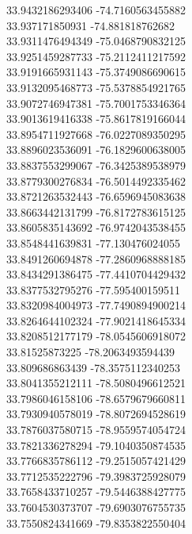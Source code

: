 {33.9432186293406	-74.7160563455882\\
33.937171850931	-74.881818762682\\
33.9311476494349	-75.0468790832125\\
33.9251459287733	-75.2112411217592\\
33.9191665931143	-75.3749086690615\\
33.9132095468773	-75.5378854921765\\
33.9072746947381	-75.7001753346364\\
33.9013619416338	-75.8617819166044\\
33.8954711927668	-76.0227089350295\\
33.8896023536091	-76.1829600638005\\
33.8837553299067	-76.3425389538979\\
33.8779300276834	-76.5014492335462\\
33.8721263532443	-76.6596945083638\\
33.8663442131799	-76.8172783615125\\
33.8605835143692	-76.9742043538455\\
33.8548441639831	-77.130476024055\\
33.8491260694878	-77.2860968888185\\
33.8434291386475	-77.4410704429432\\
33.8377532795276	-77.595400159511\\
33.8320984004973	-77.7490894900214\\
33.8264644102324	-77.9021418645334\\
33.8208512177179	-78.0545606918072\\
33.81525873225	-78.2063493594439\\
33.809686863439	-78.3575112340253\\
33.8041355212111	-78.5080496612521\\
33.7986046158106	-78.6579679660811\\
33.7930940578019	-78.8072694528619\\
33.7876037580715	-78.9559574054724\\
33.7821336278294	-79.1040350874535\\
33.7766835786112	-79.2515057421429\\
33.7712535222796	-79.3983725928079\\
33.7658433710257	-79.5446388427775\\
33.7604530373707	-79.6903076755735\\
33.7550824341669	-79.8353822550404\\
}
